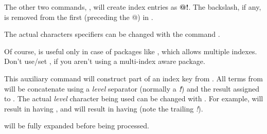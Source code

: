 \documentclass{article}
\begin{document}
The other two commands, ,  will create index entries as \textbf{@!}. The backslash, if any, is removed from the first  (preceding the @) in .

\begin{tsremark}
  The actual characters specifiers can be changed with the command \tsobj{\indexcodesetup}.
\end{tsremark}
\begin{tsremark}
Of course,  is useful only in case of packages like , which allows multiple indexes. Don't use/set , if you aren't using a multi-index aware package.
\end{tsremark}


\begin{codedescribe}[code,new=2025/12/23]{\indexgenkey}
  \begin{codesyntax}
  \end{codesyntax}
  This auxiliary command will construct part of an index key from . All terms from  will be concatenate using a \emph{level} separator (normally a \emph{\textbf{!}}) and the result assigned to .  The actual \emph{level} character being used can be changed with \tsobj{\indexcodesetup}. For example,  will result in  having , and  will result in  having  (note the trailing \emph{!}).
\end{codedescribe}
\begin{tsremark}
   will be fully expanded before being processed.
\end{tsremark}
\end{document}
